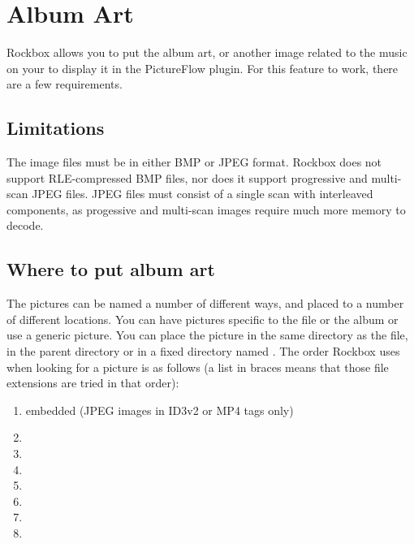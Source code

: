 \chapter{\label{ref:album_art}Album Art}
Rockbox allows you to put the album art, or another image related to the music
on your \dap{} to display it in the PictureFlow plugin. For this feature to work, there are a few requirements.

\section{Limitations}

%
%
The image files must be in either BMP or JPEG format. Rockbox does not support RLE-compressed BMP files, nor does it
support progressive and multi-scan JPEG files.
JPEG files must consist of a single scan with interleaved components, 
as progessive and multi-scan images require much more memory to decode.

\section{Where to put album art}

The pictures can be named a number of different ways, and placed to a number of
different locations. You can have pictures specific to the file or the album
or use a generic picture. You can place the picture in the same directory
as the file, in the parent directory or in a fixed directory named
. The order Rockbox uses when looking for a picture
is as follows (a list in braces means that those file extensions are tried in
that order):

\begin{enumerate}
\item  embedded (JPEG images in ID3v2 or MP4 tags only)
\item  {}
\item  {}
\item  {}
\item  {}
\item  {}
\item  {}
\item  {}
\end{enumerate}

